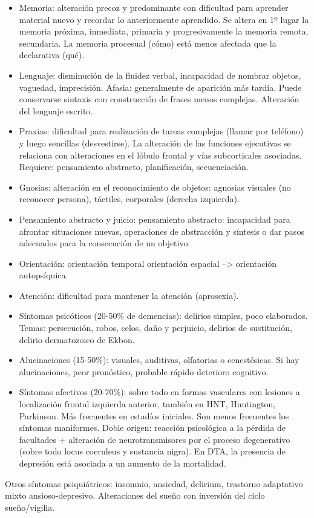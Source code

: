 \documentclass{scrbook}
\begin{document}
\begin{itemize}
	\item Memoria: alteración precoz y predominante con dificultad para aprender material nuevo y recordar lo anteriormente aprendido. Se altera en 1º lugar la memoria próxima, inmediata, primaria y progresivamente la memoria remota, secundaria. La memoria procesual (cómo) está menos afectada que la declarativa (qué).
	\item Lenguaje: disminución de la fluidez verbal, incapacidad de nombrar objetos, vaguedad, imprecisión. Afasia: generalmente de aparición más tardía. Puede conservarse sintaxis con construcción de frases menos complejas. Alteración del lenguaje escrito.
	\item Praxias: dificultad para realización de tareas complejas (llamar por teléfono) y luego sencillas (desvestirse). La alteración de las funciones ejecutivas se relaciona con alteraciones en el lóbulo frontal y vías subcorticales asociadas. Requiere: pensamiento abstracto, planificación, secuenciación.
	\item Gnosias: alteración en el reconocimiento de objetos: agnosias visuales (no reconocer persona), táctiles, corporales (derecha izquierda).
	\item Pensamiento abstracto y juicio: pensamiento abstracto: incapacidad para afrontar situaciones nuevas, operaciones de abstracción y síntesis o dar pasos adecuados para la consecución de un objetivo.
	\item Orientación: orientación temporal orientación espacial –> orientación autopsíquica.
	\item Atención: dificultad para mantener la atención (aprosexia).
	\item Síntomas psicóticos (20-50\% de demencias): delirios simples, poco elaborados. Temas: persecución, robos, celos, daño y perjuicio, delirios de sustitución, delirio dermatozoico de Ekbon.
	\item Alucinaciones (15-50\%): visuales, auditivas, olfatorias o cenestésicas. Si hay alucinaciones, peor pronóstico, probable rápido deterioro cognitivo.
	\item Síntomas afectivos (20-70\%): sobre todo en formas vasculares con lesiones a localización frontal izquierda anterior, también en HNT, Huntington, Parkinson. Más frecuentes en estadíos iniciales. Son menos frecuentes los síntomas maniformes. Doble origen: reacción psicológica a la pérdida de facultades + alteración de neurotransmisores por el proceso degenerativo (sobre todo locus coeruleus y sustancia nigra). En DTA, la presencia de depresión está asociada a un aumento de la mortalidad.
\end{itemize}
Otros síntomas psiquiátricos: insomnio, ansiedad, delirium, trastorno adaptativo mixto ansioso-depresivo. Alteraciones del sueño con inversión del ciclo sueño/vigilia.
\end{document}
